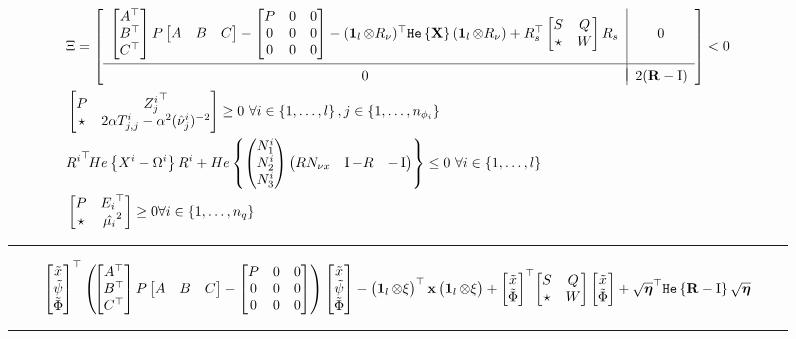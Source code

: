 \documentclass{ifacconf}
\theoremstyle{plain}
\begin{document}
\begin{figure}
\begin{subequations}\label{eqn:LMI}
\begin{align}\label{eqn:lyapunov}
  &\Xi =\bmx{
  \begin{array}{c|c}
  \bmx{\bar{A}\tr\\
  \bar{B}\tr\\
  C\tr
  } P \bmx{\bar{A} & \bar{B} & C} - \bmx{
  P & 0 & 0\\
  0 & 0 & 0\\
  0 & 0 & 0
  } - (\1_l \otimes R_{\nu})\tr \He{\bX} (\1_l \otimes R_{\nu})
   + R_s\tr \bmx{
    S & Q\\
    \star & W
  }  R_s\hspace{.1em}& 0\\[1.5em]
\hline \\[-0.9em]
  0 & \hspace{.1em} 2 (\bR - \Id)
  \end{array}} < 0\\
  &\bmx{
    P & {Z_j^i}\tr\\
    \star & 2 \alpha T^i_{j,j} - \alpha^2 (\hat{\nu}_j^i)^{-2}
  } \geq 0 \ \forall i \in \left\{ 1, \dots, l \right\}, j \in \left\{ 1, \dots, n_{\phi_i} \right\} \label{eqn:inclusion}\\
  &{R^i}\tr\! He\left\{X^i - \Omega^i\right\} R^i + He\left\{ \pmx{N^i_1\\ N^i_2\\ N^i_3} \pmx{R N_{\nu x} & \Id - R & -\Id}\right\} \leq 0 \ \forall i \in \left\{ 1, \dots, l \right\} \label{eqn:finsler_constraint}\\
  &\bmx{P & {E_i}\tr \\ \star & \hat{\mu_i}^2} \geq 0 \forall i \in \left\{1, \dots, n_q \right\} \label{eqn:nonlin-inclusion-constraint}
\end{align}
\end{subequations}
\vspace{.5em}
\hrule
\end{figure}
\begin{figure}
\begin{equation}\label{eqn:first-step}
 \bmx{\tilde{x} \\ \tilde{\psi} \\ \tilde{\Phi}}\tr \left( \!
  \bmx{\bar{A}\tr\\
  \bar{B}\tr\\
  C\tr
  } P \bmx{\bar{A} & \bar{B} & C} - \bmx{
  P & 0 & 0\\
  0 & 0 & 0\\
  0 & 0 & 0
  } \right) \bmx{\tilde{x} \\ \tilde{\psi} \\ \tilde{\Phi}}
 - \pmx{\1_l \otimes \xi}\tr \bx \pmx{\1_l \otimes \xi}
 + \bmx{\tilde{x}\\ \tilde{\Phi}}\tr\! \bmx{S & Q\\ \star & W} \bmx{\tilde{x} \\ \tilde{\Phi}}
 + \sqrt{\boldsymbol{\eta}}\tr \He{\bR - \Id} \sqrt{\boldsymbol{\eta}}
\end{equation}
\vspace{.5em}
\hrule
\end{figure}
\end{document}
